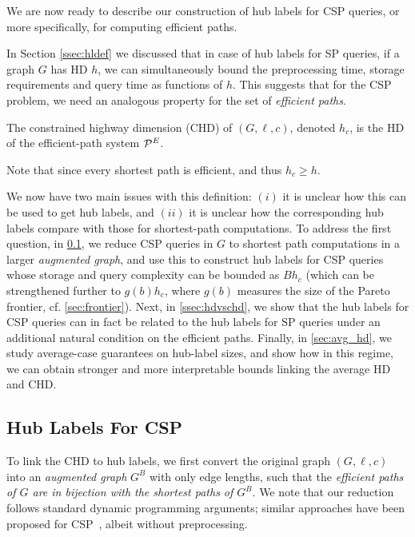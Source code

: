 We are now ready to describe our construction of hub labels for CSP queries, or more specifically, for computing efficient paths. 

In Section \ref{ssec:hldef} we discussed that in case of hub labels for SP queries, if a graph $G$ has HD $h$, we can simultaneously bound the preprocessing time, storage requirements and query time as functions of $h$.
This suggests that for the CSP problem, we need an analogous property for the set of \emph{efficient paths}.
\begin{definition} The constrained highway dimension (CHD) of $(G,\ell,c)$, denoted $h_c$, is the HD of the efficient-path system $\mathcal{P}^E$.
\end{definition}
\noindent Note that since every shortest path is efficient, and thus $h_c\geq h$.

We now have two main issues with this definition: $(i)$ it is unclear how this can be used to get hub labels, and $(ii)$ it is unclear how the corresponding hub labels compare with those for shortest-path computations. 
To address the first question, in \cref{ssec:aug}, we reduce CSP queries in $G$ to shortest path computations in a larger \emph{augmented graph}, and use this to construct hub labels for CSP queries whose storage and query complexity can be bounded as $Bh_c$ (which can be strengthened further to $g(b)h_c$, where $g(b)$ measures the size of the Pareto frontier, cf. \cref{sec:frontier}). 
Next, in \cref{ssec:hdvschd}, we show that the hub labels for CSP queries can in fact be related to the hub labels for SP queries under an additional natural condition on the efficient paths.
Finally, in \cref{sec:avg_hd}, we study average-case guarantees on hub-label sizes, and show how in this regime, we can obtain stronger and more interpretable bounds linking the average HD and CHD.

\subsection{Hub Labels For CSP}
\label{ssec:aug}

To link the CHD to hub labels, we first convert the original graph $(G,\ell,c)$ into an \emph{augmented graph} $G^B$ with only edge lengths, such that the \emph{efficient paths of $G$ are in bijection with the shortest paths of $G^B$}. We note that our reduction follows standard dynamic programming arguments; similar approaches have been proposed for CSP~\cite{alex_bicriteria}, albeit without preprocessing.


